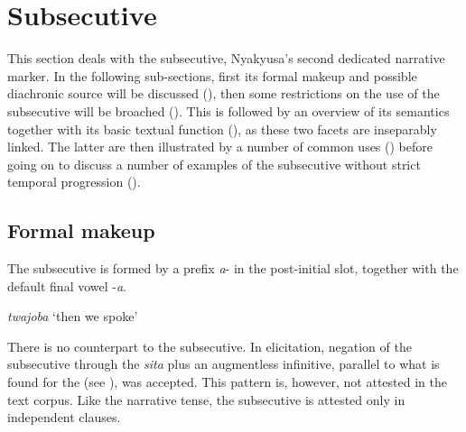 \section{Subsecutive}\label{Subsecutive}
This section deals with the subsecutive, Nyakyusa's second dedicated narrative marker. In the following sub-sections, first its formal makeup and possible diachronic source will be discussed (), then some restrictions on the use of the subsecutive will be broached (). This is followed by an overview of its semantics together with its basic textual function (), as these two facets are inseparably linked. The latter are then illustrated by a number of common uses () before going on to discuss a number of examples of the subsecutive without strict temporal progression ().
\subsection{Formal makeup}\label{SubsecutiveIntroduction}
\largerpage
The subsecutive is formed by a prefix \textit{a}- in the post-initial slot, together with the default final vowel -\textit{a}.

\begin{exe}
\ex \textit{twajoba} `then we spoke'
\end{exe}

There is no  counterpart to the subsecutive. In elicitation, negation of the subsecutive through the   \textit{sita} plus an augmentless infinitive, parallel to what is found for the  (see ), was accepted. This pattern is, however, not attested in the text corpus. Like the narrative tense, the subsecutive is attested only in independent clauses.

